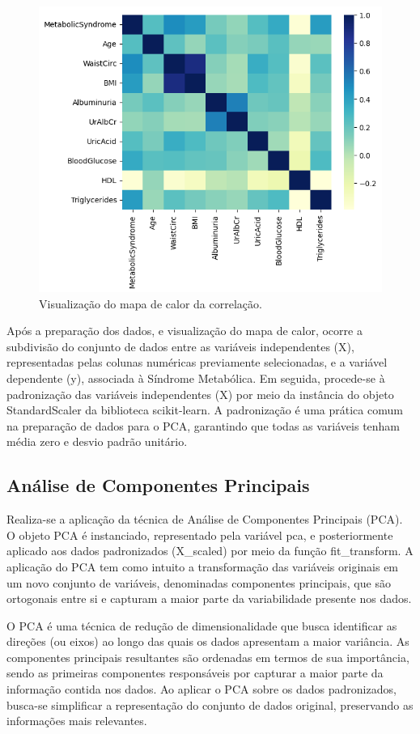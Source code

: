 \documentclass[12pt, a4paper]{article}
\begin{document}
\begin{figure}[htbp]
    \centering
    \includegraphics[scale=0.5]{img/heat.png}
    \caption{Visualização do mapa de calor da correlação.}
\end{figure}
\break
Após a preparação dos dados, e visualização do mapa de calor, ocorre a subdivisão do conjunto de dados entre as variáveis independentes (X), representadas pelas colunas numéricas previamente selecionadas, e a variável dependente (y), associada à Síndrome Metabólica.
Em seguida, procede-se à padronização das variáveis independentes (X) por meio da instância do objeto StandardScaler da biblioteca scikit-learn. A padronização é uma prática comum na preparação de dados para o PCA, garantindo que todas as variáveis tenham média zero e desvio padrão unitário. \par
\subsection{Análise de Componentes Principais}
Realiza-se a aplicação da técnica de Análise de Componentes Principais (PCA). O objeto PCA é instanciado, representado pela variável pca, e posteriormente aplicado aos dados padronizados (X\_scaled) por meio da função fit\_transform. A aplicação do PCA tem como intuito a transformação das variáveis originais em um novo conjunto de variáveis, denominadas componentes principais, que são ortogonais entre si e capturam a maior parte da variabilidade presente nos dados.

O PCA é uma técnica de redução de dimensionalidade que busca identificar as direções (ou eixos) ao longo das quais os dados apresentam a maior variância. As componentes principais resultantes são ordenadas em termos de sua importância, sendo as primeiras componentes responsáveis por capturar a maior parte da informação contida nos dados. Ao aplicar o PCA sobre os dados padronizados, busca-se simplificar a representação do conjunto de dados original, preservando as informações mais relevantes. \\
\end{document}
